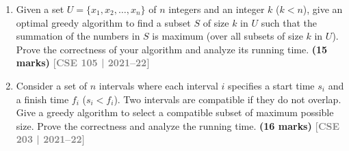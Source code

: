 \documentclass[12pt,a3paper]{article}
\newcommand{\yr}[1]{\hfill\textcolor{gray}{\small\textbf{[#1]}}}
\newcommand{\mk}[1]{\textcolor{orange!70!black}{\small\textbf{(#1 marks)}}}
\begin{document}
\begin{enumerate}
\begin{center}
\end{center}

\item Given a set $U = \{x_1, x_2, \ldots, x_n\}$ of $n$ integers and an integer $k$ ($k < n$), give an optimal greedy algorithm to find a subset $S$ of size $k$ in $U$ such that the summation of the numbers in $S$ is maximum (over all subsets of size $k$ in $U$). Prove the correctness of your algorithm and analyze its running time. \mk{15}
\yr{CSE 105 | 2021--22}

\item Consider a set of $n$ intervals where each interval $i$ specifies a start time $s_i$ and a finish time $f_i$ ($s_i < f_i$). Two intervals are compatible if they do not overlap. Give a greedy algorithm to select a compatible subset of maximum possible size. Prove the correctness and analyze the running time. \mk{16}
\yr{CSE 203 | 2021--22}


\end{enumerate}
\end{document}
